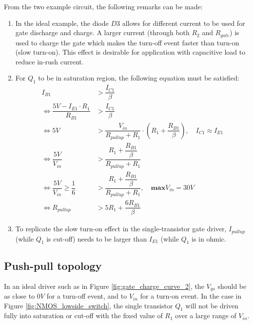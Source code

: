 \documentclass[main.tex]{subfiles}
\begin{document}
    \justify
    From the two example circuit, the following remarks can be made:
    \begin{enumerate}
        \item In the ideal example, the diode $D3$ allows for different current to be used for gate discharge and charge. A larger current (through both $R_2$ and $R_{gate}$) is used to charge the gate which makes the turn-off event faster than turn-on (slow turn-on). This effect is desirable for application with capacitive load to reduce in-rush current.
        \item For $Q_1$ to be in saturation region, the following equation must be satisfied:
        \begin{equation} 
        \begin{split}
            I_{B1} &> \dfrac{I_{C1}}{\beta}\\
\Longleftrightarrow \dfrac{5V - I_{E1} \cdot R_1}{R_{B1}} &> \dfrac{I_{C1}}{\beta}\\
\Longleftrightarrow 5V &> \dfrac{V_{in}}{R_{pullup} + R_1}\cdot(R_1 + \dfrac{R_{B1}}{\beta}), \quad I_{C1}\approx I_{E1} \\
\Longleftrightarrow \dfrac{5V}{V_{in}} &> \dfrac{R_1 + \dfrac{R_{B1}}{\beta}}{R_{pullup} + R_1} \\
\Longleftrightarrow \dfrac{5V}{V_{in}} \geq \dfrac{1}{6} &> \dfrac{R_1 + \dfrac{R_{B1}}{\beta}}{R_{pullup} + R_1}, \quad \textbf{max}V_{in} = 30V \\
\Longleftrightarrow R_{pullup} &> 5R_1 + \dfrac{6R_{B1}}{\beta}
        \end{split}
        \end{equation}
        \item To replicate the slow turn-on effect in the single-transistor gate driver, $I_{pullup}$ (while $Q_1$ is cut-off) needs to be larger than $I_{E1}$ (while $Q_1$ is in ohmic.
    \end{enumerate}

    \pagebreak
    \subsection{Push-pull topology}

    \justify
    In an ideal driver such as in Figure \ref{fig:gate_charge_curve_2}, the $V_{gs}$ should be as close to $0V$ for a turn-off event, and to $V_{in}$ for a turn-on event. In the case in Figure \ref{fig:NMOS_lowside_switch}, the single transistor $Q_1$ will not be driven fully into saturation or cut-off with the fixed value of $R_1$ over a large range of $V_{in}$. 
\end{document}
